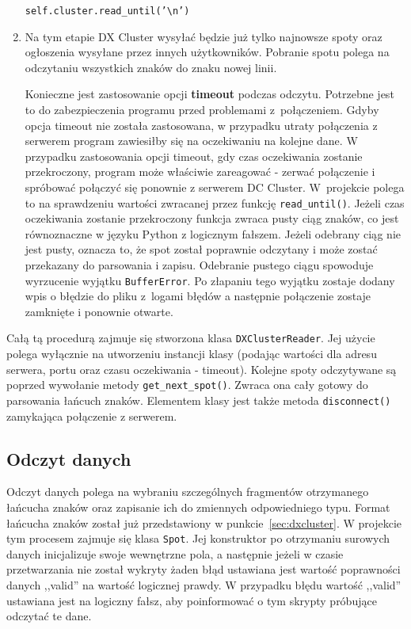\documentclass[]{mgr}
\begin{document}
\begin{enumerate}
                \texttt{self.cluster.read\_until('\textbackslash{}n')}\\
                \item Na tym etapie DX Cluster wysyłać będzie już tylko najnowsze spoty oraz ogłoszenia wysyłane przez innych użytkowników. Pobranie spotu polega na odczytaniu wszystkich znaków do znaku nowej linii.
                
                Konieczne jest zastosowanie opcji \textbf{timeout} podczas odczytu. Potrzebne jest to do zabezpieczenia programu przed problemami z~połączeniem. Gdyby opcja timeout nie została zastosowana, w przypadku utraty połączenia z serwerem program zawiesiłby się na oczekiwaniu na kolejne dane. W przypadku zastosowania opcji timeout, gdy czas oczekiwania zostanie przekroczony, program może właściwie zareagować - zerwać połączenie i spróbować połączyć się ponownie z serwerem DC Cluster. W~projekcie polega to na sprawdzeniu wartości zwracanej przez funkcję \texttt{read\_until()}. Jeżeli czas oczekiwania zostanie przekroczony funkcja zwraca pusty ciąg znaków, co jest równoznaczne w języku Python z logicznym fałszem. Jeżeli odebrany ciąg nie jest pusty, oznacza to, że spot został poprawnie odczytany i może zostać przekazany do parsowania i zapisu. Odebranie pustego ciągu spowoduje wyrzucenie wyjątku \texttt{BufferError}. Po złapaniu tego wyjątku zostaje dodany wpis o błędzie do pliku z~logami błędów a następnie połączenie zostaje zamknięte i ponownie otwarte.
            \end{enumerate}
            Całą tą procedurą zajmuje się stworzona klasa \texttt{DXClusterReader}. Jej użycie polega wyłącznie na utworzeniu instancji klasy (podając wartości dla adresu serwera, portu oraz czasu oczekiwania - timeout). Kolejne spoty odczytywane są poprzed wywołanie metody \texttt{get\_next\_spot()}. Zwraca ona cały gotowy do parsowania łańcuch znaków. Elementem klasy jest także metoda \texttt{disconnect()} zamykająca połączenie z serwerem.

            \subsection{Odczyt danych}
            Odczyt danych polega na wybraniu szczególnych fragmentów otrzymanego łańcucha znaków oraz zapisanie ich do zmiennych odpowiedniego typu. Format łańcucha znaków został już przedstawiony w punkcie~\ref{sec:dxcluster}. W projekcie tym procesem zajmuje się klasa \texttt{Spot}. Jej konstruktor po otrzymaniu surowych danych inicjalizuje swoje wewnętrzne pola, a następnie jeżeli w czasie przetwarzania nie został wykryty żaden błąd ustawiana jest wartość poprawności danych ,,valid'' na wartość logicznej prawdy. W przypadku błędu wartość ,,valid'' ustawiana jest na logiczny fałsz, aby poinformować o tym skrypty próbujące odczytać te dane.
\end{document}
